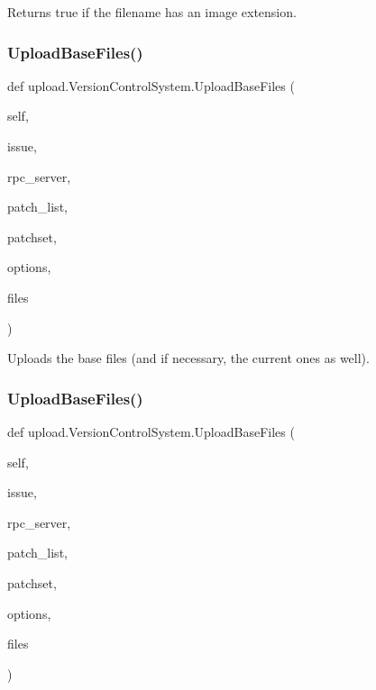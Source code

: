 \begin{DoxyVerb}Returns true if the filename has an image extension.\end{DoxyVerb}
 \mbox{\label{classupload_1_1_version_control_system_a7e334f967301b9e85e5a9c39f5036823}} 
\subsubsection{\texorpdfstring{UploadBaseFiles()}{UploadBaseFiles()}\hspace{0.1cm}{\footnotesize\ttfamily [1/2]}}
{\footnotesize\ttfamily def upload.\+Version\+Control\+System.\+Upload\+Base\+Files (\begin{DoxyParamCaption}\item[{}]{self,  }\item[{}]{issue,  }\item[{}]{rpc\+\_\+server,  }\item[{}]{patch\+\_\+list,  }\item[{}]{patchset,  }\item[{}]{options,  }\item[{}]{files }\end{DoxyParamCaption})}

\begin{DoxyVerb}Uploads the base files (and if necessary, the current ones as well).\end{DoxyVerb}
 \mbox{\label{classupload_1_1_version_control_system_a7e334f967301b9e85e5a9c39f5036823}} 
\subsubsection{\texorpdfstring{UploadBaseFiles()}{UploadBaseFiles()}\hspace{0.1cm}{\footnotesize\ttfamily [2/2]}}
{\footnotesize\ttfamily def upload.\+Version\+Control\+System.\+Upload\+Base\+Files (\begin{DoxyParamCaption}\item[{}]{self,  }\item[{}]{issue,  }\item[{}]{rpc\+\_\+server,  }\item[{}]{patch\+\_\+list,  }\item[{}]{patchset,  }\item[{}]{options,  }\item[{}]{files }\end{DoxyParamCaption})}

